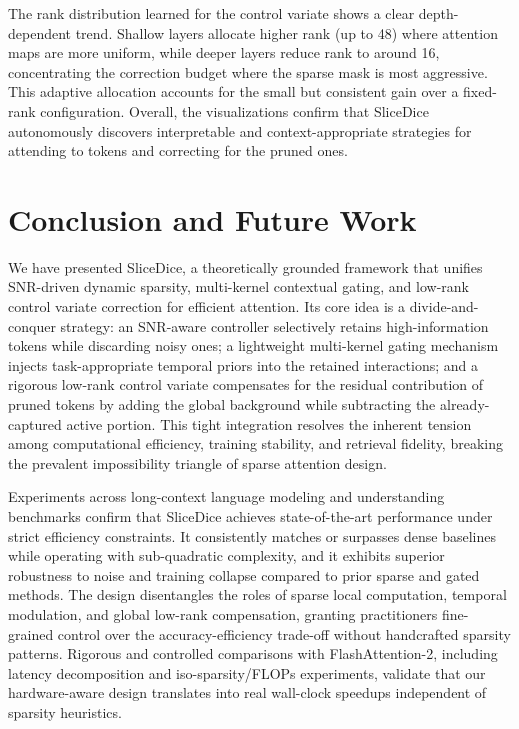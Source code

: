 \documentclass{article}
\begin{document}
The rank distribution learned for the control variate shows a clear depth-dependent trend. Shallow layers allocate higher rank (up to 48) where attention maps are more uniform, while deeper layers reduce rank to around 16, concentrating the correction budget where the sparse mask is most aggressive. This adaptive allocation accounts for the small but consistent gain over a fixed-rank configuration. Overall, the visualizations confirm that SliceDice autonomously discovers interpretable and context-appropriate strategies for attending to tokens and correcting for the pruned ones.

\section{Conclusion and Future Work}
\label{sec:conclusion}
We have presented SliceDice, a theoretically grounded framework that unifies SNR-driven dynamic sparsity, multi-kernel contextual gating, and low-rank control variate correction for efficient attention. Its core idea is a divide-and-conquer strategy: an SNR-aware controller selectively retains high-information tokens while discarding noisy ones; a lightweight multi-kernel gating mechanism injects task-appropriate temporal priors into the retained interactions; and a rigorous low-rank control variate compensates for the residual contribution of pruned tokens by adding the global background while subtracting the already-captured active portion. This tight integration resolves the inherent tension among computational efficiency, training stability, and retrieval fidelity, breaking the prevalent impossibility triangle of sparse attention design.

Experiments across long-context language modeling and understanding benchmarks confirm that SliceDice achieves state-of-the-art performance under strict efficiency constraints. It consistently matches or surpasses dense baselines while operating with sub-quadratic complexity, and it exhibits superior robustness to noise and training collapse compared to prior sparse and gated methods. The design disentangles the roles of sparse local computation, temporal modulation, and global low-rank compensation, granting practitioners fine-grained control over the accuracy-efficiency trade-off without handcrafted sparsity patterns. Rigorous and controlled comparisons with FlashAttention-2, including latency decomposition and iso-sparsity/FLOPs experiments, validate that our hardware-aware design translates into real wall-clock speedups independent of sparsity heuristics.
\end{document}
